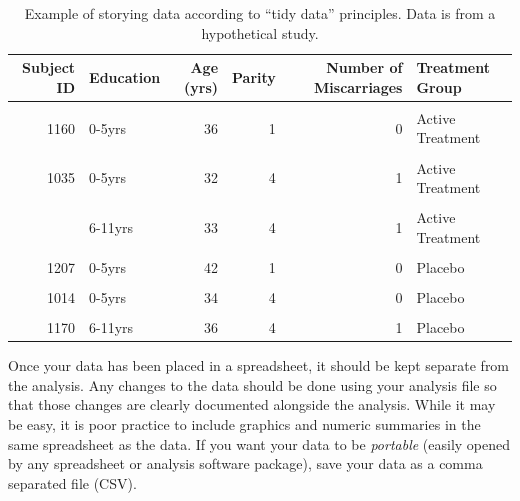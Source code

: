 \documentclass[
  letterpaper,
  DIV=11,
  numbers=noendperiod]{scrreprt}
\theoremstyle{definition}
\theoremstyle{definition}
\theoremstyle{remark}
\begin{document}
\hypertarget{tbl-statistical-process-tidy-data}{}
\begin{table}
\caption{\label{tbl-statistical-process-tidy-data}Example of storying data according to ``tidy data'' principles. Data is
from a hypothetical study. }\tabularnewline

\centering
\begin{tabular}[t]{rlrrrl}
\toprule
Subject ID & Education & Age (yrs) & Parity & Number of Miscarriages & Treatment Group\\
\midrule
\cellcolor{gray!10}{1089} & \cellcolor{gray!10}{0-5yrs} & \cellcolor{gray!10}{28} & \cellcolor{gray!10}{6} & \cellcolor{gray!10}{0} & \cellcolor{gray!10}{Active Treatment}\\
1160 & 0-5yrs & 36 & 1 & 0 & Active Treatment\\
\cellcolor{gray!10}{1025} & \cellcolor{gray!10}{0-5yrs} & \cellcolor{gray!10}{34} & \cellcolor{gray!10}{6} & \cellcolor{gray!10}{0} & \cellcolor{gray!10}{Active Treatment}\\
1035 & 0-5yrs & 32 & 4 & 1 & Active Treatment\\
\cellcolor{gray!10}{1112} & \cellcolor{gray!10}{6-11yrs} & \cellcolor{gray!10}{32} & \cellcolor{gray!10}{3} & \cellcolor{gray!10}{0} & \cellcolor{gray!10}{Active Treatment}\\
\addlinespace
1030 & 6-11yrs & 33 & 4 & 1 & Active Treatment\\
\cellcolor{gray!10}{1159} & \cellcolor{gray!10}{0-5yrs} & \cellcolor{gray!10}{26} & \cellcolor{gray!10}{6} & \cellcolor{gray!10}{2} & \cellcolor{gray!10}{Placebo}\\
1207 & 0-5yrs & 42 & 1 & 0 & Placebo\\
\cellcolor{gray!10}{1179} & \cellcolor{gray!10}{0-5yrs} & \cellcolor{gray!10}{39} & \cellcolor{gray!10}{6} & \cellcolor{gray!10}{0} & \cellcolor{gray!10}{Placebo}\\
1014 & 0-5yrs & 34 & 4 & 0 & Placebo\\
\addlinespace
\cellcolor{gray!10}{1195} & \cellcolor{gray!10}{6-11yrs} & \cellcolor{gray!10}{35} & \cellcolor{gray!10}{3} & \cellcolor{gray!10}{1} & \cellcolor{gray!10}{Placebo}\\
1170 & 6-11yrs & 36 & 4 & 1 & Placebo\\
\bottomrule
\end{tabular}
\end{table}

Once your data has been placed in a spreadsheet, it should be kept
separate from the analysis. Any changes to the data should be done using
your analysis file so that those changes are clearly documented
alongside the analysis. While it may be easy, it is poor practice to
include graphics and numeric summaries in the same spreadsheet as the
data. If you want your data to be \emph{portable} (easily opened by any
spreadsheet or analysis software package), save your data as a comma
separated file (CSV).
\end{document}

